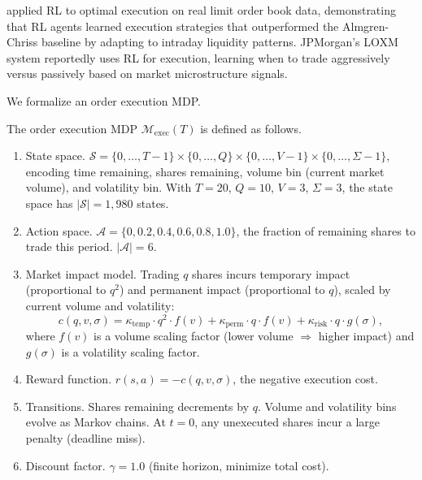 \citet{Nevmyvaka2006execution} applied RL to optimal execution on real limit order book data, demonstrating that RL agents learned execution strategies that outperformed the Almgren-Chriss baseline by adapting to intraday liquidity patterns. JPMorgan's LOXM system reportedly uses RL for execution, learning when to trade aggressively versus passively based on market microstructure signals.

We formalize an order execution MDP.

\begin{definition}
\label{def:execution_mdp}
The order execution MDP $\mathcal{M}_{\mathrm{exec}}(T)$ is defined as follows.
\begin{enumerate}
    \item State space. $\mathcal{S} = \{0, \ldots, T-1\} \times \{0, \ldots, Q\} \times \{0, \ldots, V-1\} \times \{0, \ldots, \Sigma-1\}$, encoding time remaining, shares remaining, volume bin (current market volume), and volatility bin. With $T = 20$, $Q = 10$, $V = 3$, $\Sigma = 3$, the state space has $|\mathcal{S}| = 1{,}980$ states.
    \item Action space. $\mathcal{A} = \{0, 0.2, 0.4, 0.6, 0.8, 1.0\}$, the fraction of remaining shares to trade this period. $|\mathcal{A}| = 6$.
    \item Market impact model. Trading $q$ shares incurs temporary impact (proportional to $q^2$) and permanent impact (proportional to $q$), scaled by current volume and volatility:
    \begin{equation}
    \label{eq:execution_cost}
    c(q, v, \sigma) = \kappa_{\mathrm{temp}} \cdot q^2 \cdot f(v) + \kappa_{\mathrm{perm}} \cdot q \cdot f(v) + \kappa_{\mathrm{risk}} \cdot q \cdot g(\sigma),
    \end{equation}
    where $f(v)$ is a volume scaling factor (lower volume $\Rightarrow$ higher impact) and $g(\sigma)$ is a volatility scaling factor.
    \item Reward function. $r(s, a) = -c(q, v, \sigma)$, the negative execution cost.
    \item Transitions. Shares remaining decrements by $q$. Volume and volatility bins evolve as Markov chains. At $t = 0$, any unexecuted shares incur a large penalty (deadline miss).
    \item Discount factor. $\gamma = 1.0$ (finite horizon, minimize total cost).
\end{enumerate}
\end{definition}

